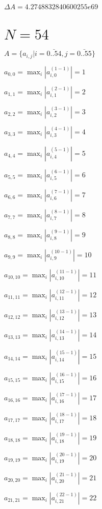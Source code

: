 \documentclass[a4paper,12pt]{article}
\begin{document}
$\Delta A = 4.2748832840600255e69$



\section{ $N = 54$ }
$A = \{ a _{ i, j } | i = \bar { 0..54 }, j = \bar { 0..55 } \}$

$a _{ 0, 0 } =  \max _i |a _{ i, 0 } ^{ (1 - 1) } | = 1$

$a _{ 1, 1 } =  \max _i |a _{ i, 1 } ^{ (2 - 1) } | = 2$

$a _{ 2, 2 } =  \max _i |a _{ i, 2 } ^{ (3 - 1) } | = 3$

$a _{ 3, 3 } =  \max _i |a _{ i, 3 } ^{ (4 - 1) } | = 4$

$a _{ 4, 4 } =  \max _i |a _{ i, 4 } ^{ (5 - 1) } | = 5$

$a _{ 5, 5 } =  \max _i |a _{ i, 5 } ^{ (6 - 1) } | = 6$

$a _{ 6, 6 } =  \max _i |a _{ i, 6 } ^{ (7 - 1) } | = 7$

$a _{ 7, 7 } =  \max _i |a _{ i, 7 } ^{ (8 - 1) } | = 8$

$a _{ 8, 8 } =  \max _i |a _{ i, 8 } ^{ (9 - 1) } | = 9$

$a _{ 9, 9 } =  \max _i |a _{ i, 9 } ^{ (10 - 1) } | = 10$

$a _{ 10, 10 } =  \max _i |a _{ i, 10 } ^{ (11 - 1) } | = 11$

$a _{ 11, 11 } =  \max _i |a _{ i, 11 } ^{ (12 - 1) } | = 12$

$a _{ 12, 12 } =  \max _i |a _{ i, 12 } ^{ (13 - 1) } | = 13$

$a _{ 13, 13 } =  \max _i |a _{ i, 13 } ^{ (14 - 1) } | = 14$

$a _{ 14, 14 } =  \max _i |a _{ i, 14 } ^{ (15 - 1) } | = 15$

$a _{ 15, 15 } =  \max _i |a _{ i, 15 } ^{ (16 - 1) } | = 16$

$a _{ 16, 16 } =  \max _i |a _{ i, 16 } ^{ (17 - 1) } | = 17$

$a _{ 17, 17 } =  \max _i |a _{ i, 17 } ^{ (18 - 1) } | = 18$

$a _{ 18, 18 } =  \max _i |a _{ i, 18 } ^{ (19 - 1) } | = 19$

$a _{ 19, 19 } =  \max _i |a _{ i, 19 } ^{ (20 - 1) } | = 20$

$a _{ 20, 20 } =  \max _i |a _{ i, 20 } ^{ (21 - 1) } | = 21$

$a _{ 21, 21 } =  \max _i |a _{ i, 21 } ^{ (22 - 1) } | = 22$
\end{document}

